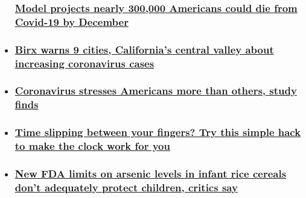 \begin{itemize}
{  \subsubsection{\texorpdfstring{\href{/2020/08/06/health/us-coronavirus-thursday/index.html}{Model
  projects nearly 300,000 Americans could die from Covid-19 by
  December}}{Model projects nearly 300,000 Americans could die from Covid-19 by December}}\label{model-projects-nearly-300000-americans-could-die-from-covid-19-by-december}}
\item
  \hypertarget{birx-warns-9-cities-californias-central-valley-about-increasing-coronavirus-cases-}{%
  \subsubsection{\texorpdfstring{\href{/2020/08/05/health/birx-warning-cities-coronavirus/index.html}{Birx
  warns 9 cities, California's central valley about increasing
  coronavirus cases
  }}{Birx warns 9 cities, California's central valley about increasing coronavirus cases }}\label{birx-warns-9-cities-californias-central-valley-about-increasing-coronavirus-cases-}}
\item
  \hypertarget{coronavirus-stresses-americans-more-than-others-study-finds}{%
  \subsubsection{\texorpdfstring{\href{/2020/08/06/health/us-coronavirus-mental-health-problems-wellness/index.html}{Coronavirus
  stresses Americans more than others, study
  finds}}{Coronavirus stresses Americans more than others, study finds}}\label{coronavirus-stresses-americans-more-than-others-study-finds}}
\item
  \hypertarget{time-slipping-between-your-fingers-try-this-simple-hack-to-make-the-clock-work-for-you}{%
  \subsubsection{\texorpdfstring{\href{/2020/08/06/health/time-saving-pomodoro-technique-wisdom-project-wellness/index.html}{Time
  slipping between your fingers? Try this simple hack to make the clock
  work for
  you}}{Time slipping between your fingers? Try this simple hack to make the clock work for you}}\label{time-slipping-between-your-fingers-try-this-simple-hack-to-make-the-clock-work-for-you}}
\item
  \hypertarget{new-fda-limits-on-arsenic-levels-in-infant-rice-cereals-dont-adequately-protect-children-critics-say}{%
  \subsubsection{\texorpdfstring{\href{/2020/08/06/health/arsenic-infant-rice-cereal-fda-wellness/index.html}{New
  FDA limits on arsenic levels in infant rice cereals don't adequately
  protect children, critics
  say}}{New FDA limits on arsenic levels in infant rice cereals don't adequately protect children, critics say}}\label{new-fda-limits-on-arsenic-levels-in-infant-rice-cereals-dont-adequately-protect-children-critics-say}}
\end{itemize}

